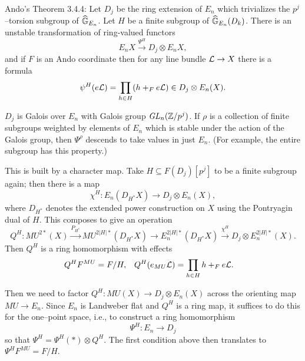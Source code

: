 
Ando's Theorem 3.4.4: Let $D_j$ be the ring extension of $E_n$ which trivializes the $p^j$--torsion subgroup of $\widehat{\mathbb G}_{E_n}$.  Let $H$ be a finite subgroup of $\widehat{\mathbb G}_{E_n}(D_k)$.  There is an unstable transformation of ring-valued functors \[E_n X \xrightarrow{\Psi^H} D_j \otimes E_n X,\] and if $F$ is an Ando coordinate then for any line bundle $\mathcal{L} \to X$ there is a formula \[\psi^H(e\mathcal{L}) = \prod_{h \in H} (h +_F e\mathcal{L}) \in D_j \otimes E_n(X).\]

$D_j$ is Galois over $E_n$ with Galois group $\mathit{GL}_n(\mathbb Z/p^j)$.  If $\rho$ is a collection of finite subgroups weighted by elements of $E_n$ which is stable under the action of the Galois group, then $\Psi^\rho$ descends to take values in just $E_n$.  (For example, the entire subgroup has this property.)

This is built by a character map.  Take $H \subseteq F(D_j)[p^j]$ to be a finite subgroup again; then there is a map \[\chi^H: E_n(D_{H^*} X) \to D_j \otimes E_n(X),\] where $D_{H^*}$ denotes the extended power construction on $X$ using the Pontryagin dual of $H$.  This composes to give an operation \[Q^H: MU^{2*}(X) \xrightarrow{P_{H^*}} MU^{2|H|*}(D_{H^*} X) \to E_n^{2|H|*}(D_{H^*} X) \xrightarrow{\chi^H} D_j \otimes E_n^{2|H|*}(X).\]  Then $Q^H$ is a ring homomorphism with effects
\begin{align*}
Q^H F^{MU} & = F/H, &
Q^H(e_{MU} \mathcal{L}) & = \prod_{h \in H} h +_F e\mathcal{L}.
\end{align*}

Then we need to factor $Q^H: MU(X) \to D_j \otimes E_n(X)$ across the orienting map $MU \to E_n$.  Since $E_n$ is Landweber flat and $Q^H$ is a ring map, it suffices to do this for the one--point space, i.e., to construct a ring homomorphism \[\Psi^H: E_n \to D_j\] so that $\Psi^H = \Psi^H(*) \otimes Q^H$.  The first condition above then translates to $\Psi^H F^{MU} = F/H$.

